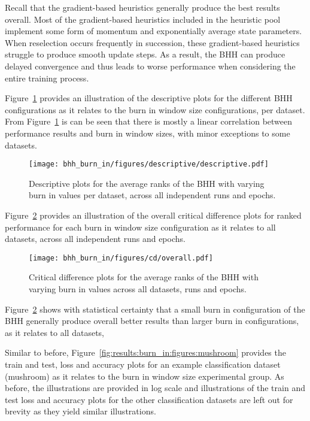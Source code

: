Recall that the gradient-based heuristics generally produce the best results overall. Most of the gradient-based heuristics included in the heuristic pool implement some form of momentum and exponentially average state parameters. When reselection occurs frequently in succession, these gradient-based heuristics struggle to produce smooth update steps. As a result, the \acs{BHH} can produce delayed convergence and thus leads to worse performance when considering the entire training process.

Figure~\ref{fig:results:burn_in:descriptive:descriptive} provides an illustration of the descriptive plots for the different \acs{BHH} configurations as it relates to the burn in window size configurations, per dataset. From Figure~\ref{fig:results:burn_in:descriptive:descriptive} is can be seen that there is mostly a linear correlation between performance results and burn in window sizes, with minor exceptions to some datasets.

\begin{figure}[htb]
	\centering
	\texttt{[image: bhh\_burn\_in/figures/descriptive/descriptive.pdf]}
	\caption{Descriptive plots for the average ranks of the \acs{BHH} with varying burn in values per dataset, across all independent runs and epochs.}
	\label{fig:results:burn_in:descriptive:descriptive}
\end{figure}

Figure~\ref{fig:results:burn_in:descriptive:cd} provides an illustration of the overall critical difference plots for ranked performance for each burn in window size configuration as it relates to all datasets, across all independent runs and epochs.

\begin{figure}[htb]
	\centering
	\texttt{[image: bhh\_burn\_in/figures/cd/overall.pdf]}
	\caption{Critical difference plots for the average ranks of the \acs{BHH} with varying burn in values across all datasets, runs and epochs.}
	\label{fig:results:burn_in:descriptive:cd}
\end{figure}

Figure~\ref{fig:results:burn_in:descriptive:cd} shows with statistical certainty that a small burn in configuration of the \acs{BHH} generally produce overall better results than larger burn in configurations, as it relates to all datasets,

Similar to before, Figure~\ref{fig:results:burn_in:figures:mushroom} provides the train and test, loss and accuracy plots for an example classification dataset (mushroom) as it relates to the burn in window size experimental group. As before, the illustrations are provided in log scale and illustrations of the train and test loss and accuracy plots for the other classification datasets are left out for brevity as they yield similar illustrations.


